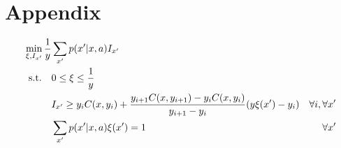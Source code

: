 \chapter{Appendix}
\begin{equation}\label{eqn:cvarvilp}
\begin{split}
\min_{\xi, I_{x'}} \dfrac{1}{y} &\sum_{x'} p(x'|x, a) I_{x'}
\\
\textup{s.t.} \quad
&0 \le \xi \le \dfrac{1}{y}\\
&I_{x'} \ge y_iC(x,y_{i})+\frac{y_{i+1}C(x,y_{i+1})-y_iC(x,y_{i})}{y_{i+1}-y_i}(y\xi(x')-y_i) &\forall i, \forall x'\\
&\sum_{x'} p(x'|x, a)\xi(x') = 1 &\forall x'
\end{split}
\end{equation}
